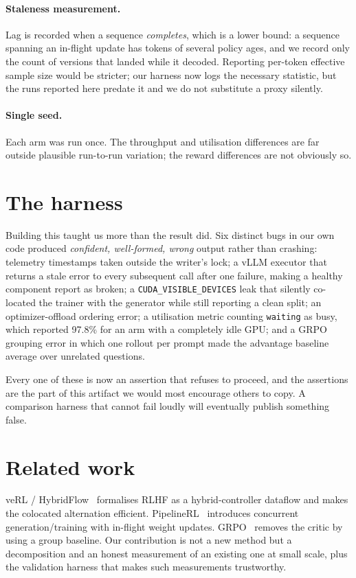 \documentclass[11pt]{article}
\begin{document}
\paragraph{Staleness measurement.} Lag is recorded when a sequence \emph{completes}, which is
a lower bound: a sequence spanning an in-flight update has tokens of several policy ages, and
we record only the count of versions that landed while it decoded. Reporting per-token
effective sample size would be stricter; our harness now logs the necessary statistic, but
the runs reported here predate it and we do not substitute a proxy silently.

\paragraph{Single seed.} Each arm was run once. The throughput and utilisation differences are
far outside plausible run-to-run variation; the reward differences are not obviously so.

\section{The harness}\label{sec:harness}

Building this taught us more than the result did. Six distinct bugs in our own code produced
\emph{confident, well-formed, wrong} output rather than crashing: telemetry timestamps taken
outside the writer's lock; a vLLM executor that returns a stale error to every subsequent call
after one failure, making a healthy component report as broken; a
\texttt{CUDA\_VISIBLE\_DEVICES} leak that silently co-located the trainer with the generator
while still reporting a clean split; an optimizer-offload ordering error; a utilisation metric
counting \texttt{waiting} as busy, which reported 97.8\% for an arm with a completely idle
GPU; and a GRPO grouping error in which one rollout per prompt made the advantage baseline
average over unrelated questions.

Every one of these is now an assertion that refuses to proceed, and the assertions are the
part of this artifact we would most encourage others to copy. A comparison harness that
cannot fail loudly will eventually publish something false.

\section{Related work}

veRL / HybridFlow~\cite{verl} formalises RLHF as a hybrid-controller dataflow and makes the
colocated alternation efficient. PipelineRL~\cite{pipelinerl} introduces concurrent
generation/training with in-flight weight updates. GRPO~\cite{grpo} removes the critic by
using a group baseline. Our contribution is not a new method but a decomposition and an
honest measurement of an existing one at small scale, plus the validation harness that makes
such measurements trustworthy.
\end{document}
